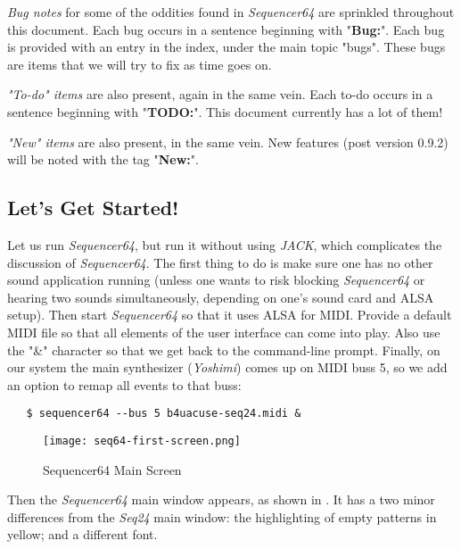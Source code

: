 \documentclass[
 11pt,
 twoside,
 a4paper,
 headinclude,
 footinclude,
 final                                 %
]{article}
\begin{document}
   \textsl{Bug notes}
   for some of the oddities found in \textsl{Sequencer64} are
   sprinkled throughout this document.
   Each bug occurs in a sentence beginning with "\textbf{Bug:}".
   Each bug is provided with an entry in the index, under the
   main topic "bugs".  These bugs are items that we will try to
   fix as time goes on.

   \textsl{"To-do" items}
   are also present, again in the same vein.
   Each to-do occurs in a sentence beginning with "\textbf{TODO:}".
   This document currently has a lot of them!

   \textsl{"New" items}
   are also present, in the same vein.
   New features (post version 0.9.2) will be noted with the tag
   "\textbf{New:}".

\subsection{Let's Get Started!}
\label{subsec:introduction_lets_get_started}

   Let us run \textsl{Sequencer64}, but run it without using \textsl{JACK},
   which complicates the discussion of \textsl{Sequencer64}.  The first
   thing to do is make sure one has no other sound application running
   (unless one wants to risk blocking \textsl{Sequencer64} or hearing two
    sounds simultaneously, depending on one's sound card and ALSA setup).
   Then start \textsl{Sequencer64} so that it uses ALSA for MIDI.  Provide a
   default MIDI file so that all elements of the user interface can come
   into play.  Also use the "\&" character so that we get back to the
   command-line prompt.  Finally, on our system the main synthesizer
   (\textsl{Yoshimi}) comes up on MIDI buss 5, so we add an option to remap
   all events to that buss:

\begin{verbatim}
   $ sequencer64 --bus 5 b4uacuse-seq24.midi &
\end{verbatim}

\begin{figure}[H]
   \centering 
   \texttt{[image: seq64-first-screen.png]}
   \caption{Sequencer64 Main Screen}
   \label{fig:seq64_main_screen}
\end{figure}

   Then the \textsl{Sequencer64} main window appears, as shown in
   .  It has a two minor differences
   from the \textsl{Seq24} main window: the highlighting of
   empty patterns in yellow; and a different font.
\end{document}
